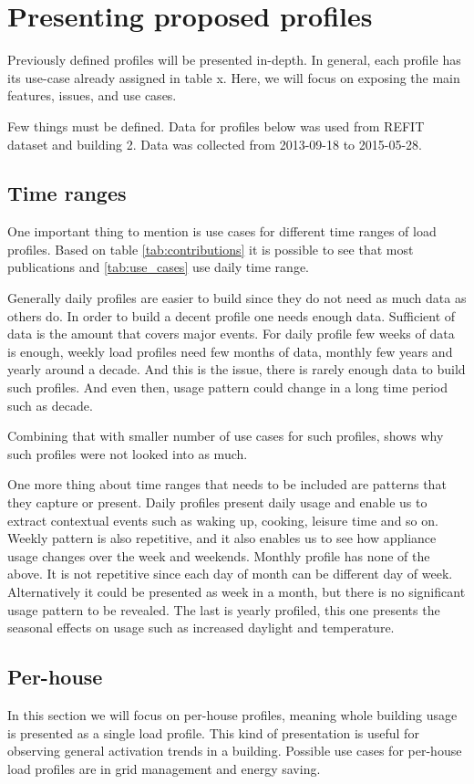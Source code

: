 \label{chapter6}
\chapter{Presenting proposed profiles}

Previously defined profiles will be presented in-depth. 
In general, each profile has its use-case already assigned in table x.
Here, we will focus on exposing the main features, issues, and use cases. 

Few things must be defined. Data for profiles below was used from REFIT dataset and building 2.
Data was collected from 2013-09-18 to 2015-05-28.
\section{Time ranges}
One important thing to mention is use cases for different time ranges of load profiles.
Based on table \ref{tab:contributions} it is possible to see that most publications and \ref{tab:use_cases} use daily time range.

Generally daily profiles are easier to build since they do not need as much data as others do.
In order to build a decent profile one needs enough data. Sufficient of data is the amount that covers major events.
For daily profile few weeks of data is enough, weekly load profiles need few months of data, monthly few years and yearly around a decade.
And this is the issue, there is rarely enough data to build such profiles. And even then, usage pattern could change in a long time period such as decade.

Combining that with smaller number of use cases for such profiles, shows why such profiles were not looked into as much.

One more thing about time ranges that needs to be included are patterns that they capture or present.
Daily profiles present daily usage and enable us to extract contextual events such as waking up, cooking, leisure time and so on.
Weekly pattern is also repetitive, and it also enables us to see how appliance usage changes over the week and weekends.
Monthly profile has none of the above. It is not repetitive since each day of month can be different day of week.
Alternatively it could be presented as week in a month, but there is no significant usage pattern to be revealed.
The last is yearly profiled, this one presents the seasonal effects on usage such as increased daylight and temperature. 


\section{Per-house}
In this section we will focus on per-house profiles, meaning whole building usage is presented as a single load profile.
This kind of presentation is useful for observing general activation trends in a building.
Possible use cases for per-house load profiles are in grid management and energy saving.

